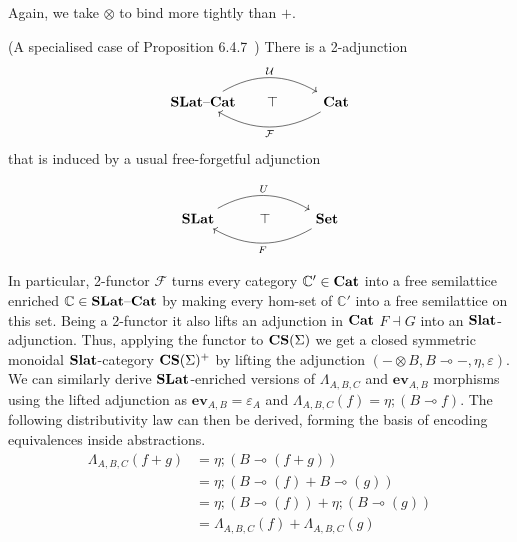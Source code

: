     Again, we take $\otimes$ to bind more tightly than $+$.
    
    \begin{proposition}(A specialised case of Proposition 6.4.7~\cite{Borceux_1994})
    There is a 2-adjunction 
    \[\begin{tikzcd}
        \catname{SLat}\text{--}\catname{Cat}\arrow[rr, "\mathcal{U}", bend left] & \hspace{-1em}\top & \catname{Cat} \arrow[ll, "\mathcal{F}", bend left]
        \end{tikzcd}
    \]
    that is induced by a usual free-forgetful adjunction 
    
    \[\begin{tikzcd}
        \catname{SLat} \arrow[rr, "U", bend left] & \top & \catname{Set} \arrow[ll, "F", bend left]
        \end{tikzcd}
    \]
    \end{proposition}
    
In particular, 2-functor $\mathcal{F}$ turns every category $\mathbb{C'} \in \mathbf{Cat}$ into a free semilattice enriched $\mathbb{C} \in \mathbf{SLat}\text{--}\mathbf{Cat}$ by making every hom-set of $\mathbb{C'}$ into a free semilattice on this set.
Being a 2-functor it also lifts an adjunction in $\mathbf{Cat}$ $F \dashv G$ into an $\mathbf{Slat}$-adjunction.
Thus, applying the functor to $\mathbf{CS}(\Sigma)$ we get a closed symmetric monoidal $\mathbf{Slat}$-category $\mathbf{CS}(\Sigma)^{+}$ by lifting the adjunction $(- \otimes B, B \multimap{} -, \eta, \varepsilon)$.
We can similarly derive $\mathbf{SLat}$-enriched versions of  $\Lambda_{A,B,C}$ and $\textbf{ev}_{A,B}$ morphisms using the lifted adjunction as $\textbf{ev}_{A,B} = \varepsilon_{A}$ and $\Lambda_{A,B,C}(f) = \eta; (B \multimap{} f)$.
The following distributivity law can then be derived, forming the basis of encoding equivalences inside abstractions.
\begin{equation}
\begin{aligned}
\Lambda_{A,B,C}(f + g) &= \eta;(B \multimap (f + g))\\
                       &= \eta;(B \multimap (f) + B \multimap (g))\\
                       &= \eta;(B \multimap (f)) + \eta;(B \multimap (g))\\
                       &= \Lambda_{A,B,C}(f) + \Lambda_{A,B,C}(g)
\end{aligned}
\end{equation}
\label{law:distributivity}

